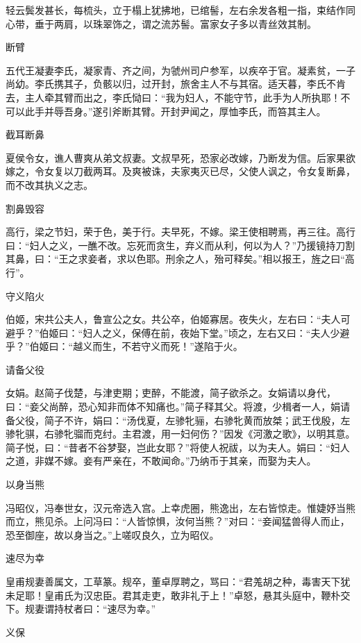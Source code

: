 \documentclass[a4paper,12pt,UTF8,twoside]{ctexbook}
\begin{document}
    轻云鬓发甚长，每梳头，立于榻上犹拂地，已绾髻，左右余发各粗一指，束结作同心带，垂于两肩，以珠翠饰之，谓之流苏髻。富家女子多以青丝效其制。
    
    断臂
    
    五代王凝妻李氏，凝家青、齐之间，为虢州司户参军，以疾卒于官。凝素贫，一子尚幼。李氏携其子，负骸以归，过开封，旅舍主人不与其宿。适天暮，李氏不肯去，主人牵其臂而出之，李氏恸曰：“我为妇人，不能守节，此手为人所执耶！不可以此手并辱吾身。”遂引斧断其臂。开封尹闻之，厚恤李氏，而笞其主人。
    
    截耳断鼻
    
    夏侯令女，谯人曹爽从弟文叔妻。文叔早死，恐家必改嫁，乃断发为信。后家果欲嫁之，令女复以刀截两耳。及爽被诛，夫家夷灭已尽，父使人讽之，令女复断鼻，而不改其执义之志。
    
    割鼻毁容
    
    高行，梁之节妇，荣于色，美于行。夫早死，不嫁。梁王使相聘焉，再三往。高行曰：“妇人之义，一醮不改。忘死而贪生，弃义而从利，何以为人？”乃援镜持刀割其鼻，曰：“王之求妾者，求以色耶。刑余之人，殆可释矣。”相以报王，旌之曰“高行”。
    
    守义陷火
    
    伯姬，宋共公夫人，鲁宣公之女。共公卒，伯姬寡居。夜失火，左右曰：“夫人可避乎？”伯姬曰：“妇人之义，保傅在前，夜始下堂。”顷之，左右又曰：“夫人少避乎？”伯姬曰：“越义而生，不若守义而死！”遂陷于火。
    
    请备父役
    
    女娟。赵简子伐楚，与津吏期；吏醉，不能渡，简子欲杀之。女娟请以身代，曰：“妾父尚醉，恐心知非而体不知痛也。”简子释其父。将渡，少楫者一人，娟请备父役，简子不许，娟曰：“汤伐夏，左骖牝骊，右骖牝黄而放桀；武王伐殷，左骖牝骐，右骖牝骝而克纣。主君渡，用一妇何伤？”因发《河激之歌》，以明其意。简子悦，曰：“昔者不谷梦娶，岂此女耶？”将使人祝祓，以为夫人。娟曰：“妇人之道，非媒不嫁。妾有严亲在，不敢闻命。”乃纳币于其亲，而娶为夫人。
    
    以身当熊
    
    冯昭仪，冯奉世女，汉元帝选入宫。上幸虎圈，熊逸出，左右皆惊走。惟婕妤当熊而立，熊见杀。上问冯曰：“人皆惊惧，汝何当熊？”对曰：“妾闻猛兽得人而止，恐至御座，故以身当之。”上嗟叹良久，立为昭仪。
    
    速尽为幸
    
    皇甫规妻善属文，工草篆。规卒，董卓厚聘之，骂曰：“君羗胡之种，毒害天下犹未足耶！皇甫氏为汉忠臣。君其走吏，敢非礼于上！”卓怒，悬其头庭中，鞭朴交下。规妻谓持杖者曰：“速尽为幸。”
    
    义保
    
\end{document}
